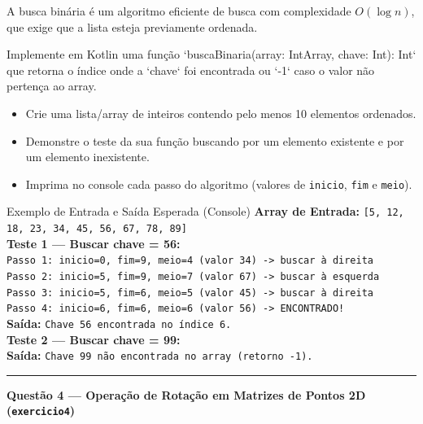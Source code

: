 \documentclass[12pt]{article}
\begin{document}
\vspace{0.2cm}
\noindent
A busca binária é um algoritmo eficiente de busca com complexidade $O(\log n)$, que exige que a lista esteja previamente ordenada. 

\vspace{0.2cm}
\noindent
Implemente em Kotlin uma função `buscaBinaria(array: IntArray, chave: Int): Int` que retorna o índice onde a `chave` foi encontrada ou `-1` caso o valor não pertença ao array.
\begin{itemize}[leftmargin=1.5em]
  \item Crie uma lista/array de inteiros contendo pelo menos 10 elementos ordenados.
  \item Demonstre o teste da sua função buscando por um elemento existente e por um elemento inexistente.
  \item Imprima no console cada passo do algoritmo (valores de \texttt{inicio}, \texttt{fim} e \texttt{meio}).
\end{itemize}

\vspace{0.2cm}
\begin{block}{Exemplo de Entrada e Saída Esperada (Console)}
\textbf{Array de Entrada:} \texttt{[5, 12, 18, 23, 34, 45, 56, 67, 78, 89]}\\
\textbf{Teste 1 — Buscar chave = 56:}\\
\texttt{Passo 1: inicio=0, fim=9, meio=4 (valor 34) -> buscar à direita}\\
\texttt{Passo 2: inicio=5, fim=9, meio=7 (valor 67) -> buscar à esquerda}\\
\texttt{Passo 3: inicio=5, fim=6, meio=5 (valor 45) -> buscar à direita}\\
\texttt{Passo 4: inicio=6, fim=6, meio=6 (valor 56) -> ENCONTRADO!}\\
\textbf{Saída:} \texttt{Chave 56 encontrada no índice 6.}\\
\textbf{Teste 2 — Buscar chave = 99:}\\
\textbf{Saída:} \texttt{Chave 99 não encontrada no array (retorno -1).}
\end{block}

\vspace{0.6cm}
\noindent\rule{\textwidth}{0.8pt}
\vspace{0.4cm}

\noindent\textbf{Questão 4 — Operação de Rotação em Matrizes de Pontos 2D (\texttt{exercicio4})}
\end{document}
